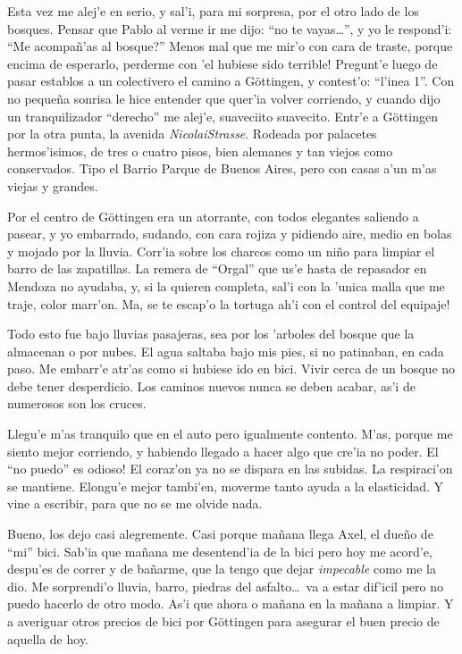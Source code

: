 Esta vez me alej'e en serio, y sal'i, para mi sorpresa, por el otro lado de los
bosques. Pensar que Pablo al verme ir me dijo: ``no te vayas\ldots'', y yo le
respond'i: ``\textquestiondown Me acompa\~n'as al bosque?'' \textexclamdown
Menos mal que me mir'o con cara de traste, porque encima de esperarlo, perderme
con 'el hubiese sido terrible! Pregunt'e luego de pasar establos a un
colectivero el camino a G\"ottingen, y contest'o: ``l'inea 1''. Con no peque\~na
sonrisa le hice entender que quer'ia volver corriendo, y cuando dijo un
tranquilizador ``derecho'' me alej'e, suaveciito suavecito. Entr'e a G\"ottingen
por la otra punta, la avenida \emph{NicolaiStrasse}. Rodeada por palacetes
hermos'isimos, de tres o cuatro pisos, bien alemanes y tan viejos como
conservados. Tipo el Barrio Parque de Buenos Aires, pero con casas a'un m'as
viejas y grandes.

Por el centro de G\"ottingen era un atorrante, con todos elegantes saliendo a
pasear, y yo embarrado, sudando, con cara rojiza y pidiendo aire, medio en bolas
y mojado por la lluvia. Corr'ia sobre los charcos como un ni\~no para limpiar el
barro de las zapatillas. La remera de ``Orgal'' que us'e hasta de repasador en
Mendoza no ayudaba, y, si la quieren completa, sal'i con la 'unica malla que me
traje, color marr'on. Ma, \textexclamdown se te escap'o la tortuga ah'i con el
control del equipaje!

Todo esto fue bajo lluvias pasajeras, sea por los 'arboles del bosque que la
almacenan o por nubes. El agua saltaba bajo mis pies, si no patinaban, en cada
paso. Me embarr'e atr'as como si hubiese ido en bici. Vivir cerca de un bosque
no debe tener desperdicio. Los caminos nuevos nunca se deben acabar, as'i de
numerosos son los cruces.

Llegu'e m'as tranquilo que en el auto pero igualmente contento. M'as, porque me
siento mejor corriendo, y habiendo llegado a hacer algo que cre'ia no poder.
\textexclamdown El ``no puedo'' es odioso! El coraz'on ya no se dispara en las
subidas. La respiraci'on se mantiene. Elongu'e mejor tambi'en, moverme tanto
ayuda a la elasticidad. Y vine a escribir, para que no se me olvide nada.

Bueno, los dejo casi alegremente. Casi porque ma\~nana llega Axel, el due\~no de
``mi'' bici. Sab'ia que ma\~nana me desentend'ia de la bici pero hoy me acord'e,
despu'es de correr y de ba\~narme, que la tengo que dejar \emph{impecable} como
me la dio. Me sorprendi'o lluvia, barro, piedras del asfalto\ldots\ va a estar
dif'icil pero no puedo hacerlo de otro modo. As'i que ahora o ma\~nana en la
ma\~nana a limpiar. Y a averiguar otros precios de bici por G\"ottingen para
asegurar el buen precio de aquella de hoy.

